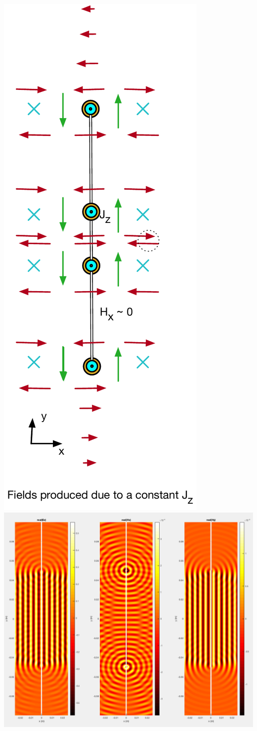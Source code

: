 \documentclass{article}
\newcommand{\0}{\varnothing}
\begin{document}
\begin{minipage}{0.45\textwidth}
\begin{center}
\includegraphics[width=0.24\columnwidth]{figures/OnlyJs}
\includegraphics[width=0.74\columnwidth]{figures/OnlyJsZeroDerv.png}
\end{center}
\end{minipage}
\end{document}
